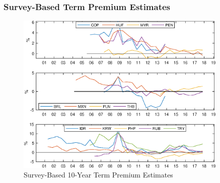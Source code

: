 \documentclass[12pt, aspectratio=169, xcolor=dvipsnames]{beamer}  %
\begin{document}
\begin{frame}
	\frametitle{Survey-Based Term Premium Estimates}
	\begin{figure}[!htbp]
		\begin{center}
			\includegraphics[trim={0 8.90cm 0 0}, clip, width=0.9\textwidth, height=0.65\textheight]{../Figures/Temp/temp_tp10yrSvy}
			\par\end{center}
		\caption{Survey-Based 10-Year Term Premium Estimates}\label{fig:tp_10yrA}
	\end{figure}
%	
\end{frame}
\end{document}
